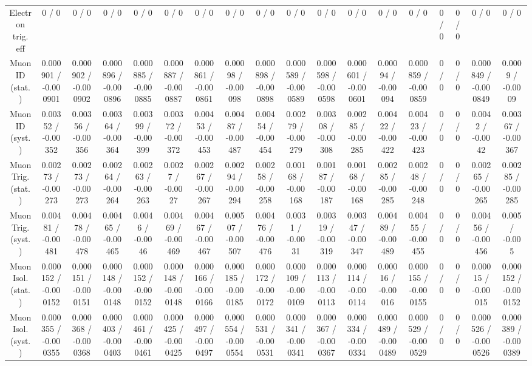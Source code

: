 \documentclass[10pt]{article}
\begin{document}
\begin{table}[htbp]
\begin{center}
\begin{tabular}{|c|c|c|c|c|c|c|c|c|c|c|c|c|c|c|c|c|c|}
  Electron trig. eff & 0 / 0 & 0 / 0 & 0 / 0 & 0 / 0 & 0 / 0 & 0 / 0 & 0 / 0 & 0 / 0 & 0 / 0 & 0 / 0 & 0 / 0 & 0 / 0 & 0 / 0 & 0 / 0 & 0 / 0 & 0 / 0 & 0 / 0 \\ 
  Muon ID (stat.) & 0.000901 / -0.000901 & 0.000902 / -0.000902 & 0.000896 / -0.000896 & 0.000885 / -0.000885 & 0.000887 / -0.000887 & 0.000861 / -0.000861 & 0.00098 / -0.00098 & 0.000898 / -0.000898 & 0.000589 / -0.000589 & 0.000598 / -0.000598 & 0.000601 / -0.000601 & 0.00094 / -0.00094 & 0.000859 / -0.000859 & 0 / 0 & 0 / 0 & 0.000849 / -0.000849 & 0.0009 / -0.0009 \\ 
  Muon ID (syst.) & 0.00352 / -0.00352 & 0.00356 / -0.00356 & 0.00364 / -0.00364 & 0.00399 / -0.00399 & 0.00372 / -0.00372 & 0.00453 / -0.00453 & 0.00487 / -0.00487 & 0.00454 / -0.00454 & 0.00279 / -0.00279 & 0.00308 / -0.00308 & 0.00285 / -0.00285 & 0.00422 / -0.00422 & 0.00423 / -0.00423 & 0 / 0 & 0 / 0 & 0.0042 / -0.0042 & 0.00367 / -0.00367 \\ 
  Muon Trig. (stat.) & 0.00273 / -0.00273 & 0.00273 / -0.00273 & 0.00264 / -0.00264 & 0.00263 / -0.00263 & 0.0027 / -0.0027 & 0.00267 / -0.00267 & 0.00294 / -0.00294 & 0.00258 / -0.00258 & 0.00168 / -0.00168 & 0.00187 / -0.00187 & 0.00168 / -0.00168 & 0.00285 / -0.00285 & 0.00248 / -0.00248 & 0 / 0 & 0 / 0 & 0.00265 / -0.00265 & 0.00285 / -0.00285 \\ 
  Muon Trig. (syst.) & 0.00481 / -0.00481 & 0.00478 / -0.00478 & 0.00465 / -0.00465 & 0.0046 / -0.0046 & 0.00469 / -0.00469 & 0.00467 / -0.00467 & 0.00507 / -0.00507 & 0.00476 / -0.00476 & 0.0031 / -0.0031 & 0.00319 / -0.00319 & 0.00347 / -0.00347 & 0.00489 / -0.00489 & 0.00455 / -0.00455 & 0 / 0 & 0 / 0 & 0.00456 / -0.00456 & 0.005 / -0.005 \\ 
  Muon Isol. (stat.) & 0.000152 / -0.000152 & 0.000151 / -0.000151 & 0.000148 / -0.000148 & 0.000152 / -0.000152 & 0.000148 / -0.000148 & 0.000166 / -0.000166 & 0.000185 / -0.000185 & 0.000172 / -0.000172 & 0.000109 / -0.000109 & 0.000113 / -0.000113 & 0.000114 / -0.000114 & 0.00016 / -0.00016 & 0.000155 / -0.000155 & 0 / 0 & 0 / 0 & 0.00015 / -0.00015 & 0.000152 / -0.000152 \\ 
  Muon Isol. (syst.) & 0.000355 / -0.000355 & 0.000368 / -0.000368 & 0.000403 / -0.000403 & 0.000461 / -0.000461 & 0.000425 / -0.000425 & 0.000497 / -0.000497 & 0.000554 / -0.000554 & 0.000531 / -0.000531 & 0.000341 / -0.000341 & 0.000367 / -0.000367 & 0.000334 / -0.000334 & 0.000489 / -0.000489 & 0.000529 / -0.000529 & 0 / 0 & 0 / 0 & 0.000526 / -0.000526 & 0.000389 / -0.000389 \\ 

\end{tabular}
\end{center}
\end{table}
\end{document}
